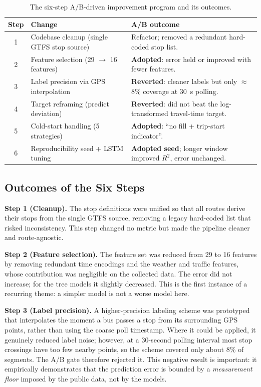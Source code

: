 \begin{table}[!htbp]
    \centering
    \caption{\label{tab:program}The six-step A/B-driven improvement program and its outcomes.}
    \begin{tabular}{@{}clp{6.0cm}@{}}
        \toprule
        \textbf{Step} & \textbf{Change} & \textbf{A/B outcome} \\
        \midrule
        1 & Codebase cleanup (single GTFS stop source) & Refactor; removed a redundant hard-coded stop list. \\
        2 & Feature selection (29 $\rightarrow$ 16 features) & \textbf{Adopted}: error held or improved with fewer features. \\
        3 & Label precision via GPS interpolation & \textbf{Reverted}: cleaner labels but only $\approx$8\% coverage at 30~s polling. \\
        4 & Target reframing (predict deviation) & \textbf{Reverted}: did not beat the log-transformed travel-time target. \\
        5 & Cold-start handling (5 strategies) & \textbf{Adopted}: ``no fill + trip-start indicator''. \\
        6 & Reproducibility seed + LSTM tuning & \textbf{Adopted seed}; longer window improved $R^2$, error unchanged. \\
        \bottomrule
    \end{tabular}
\end{table}

\subsection{Outcomes of the Six Steps}

\textbf{Step 1 (Cleanup).} The stop definitions were unified so that all routes derive their stops from the single GTFS source, removing a legacy hard-coded list that risked inconsistency. This step changed no metric but made the pipeline cleaner and route-agnostic.

\textbf{Step 2 (Feature selection).} The feature set was reduced from 29 to 16 features by removing redundant time encodings and the weather and traffic features, whose contribution was negligible on the collected data. The error did not increase; for the tree models it slightly decreased. This is the first instance of a recurring theme: a simpler model is not a worse model here.

\textbf{Step 3 (Label precision).} A higher-precision labeling scheme was prototyped that interpolates the moment a bus passes a stop from its surrounding GPS points, rather than using the coarse poll timestamp. Where it could be applied, it genuinely reduced label noise; however, at a 30-second polling interval most stop crossings have too few nearby points, so the scheme covered only about 8\% of segments. The A/B gate therefore rejected it. This negative result is important: it empirically demonstrates that the prediction error is bounded by a \emph{measurement floor} imposed by the public data, not by the models.

